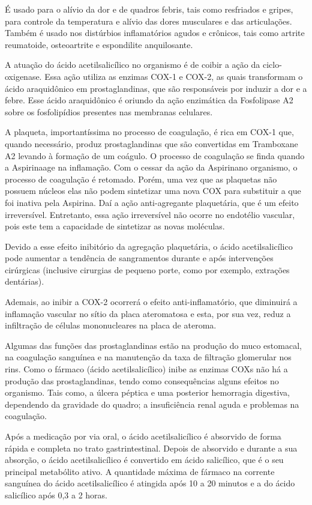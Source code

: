 É usado para o alívio da dor e de quadros febris, tais como resfriados e gripes, para controle da
temperatura e alívio das dores musculares e das articulações. Também é usado nos distúrbios
inflamatórios agudos e crônicos, tais como artrite reumatoide, osteoartrite e espondilite
anquilosante.~\cite{bulaaspirina}

A atuação do ácido acetilsalicílico no organismo é de coibir a ação da ciclo-oxigenase. Essa ação
utiliza as enzimas COX-1 e COX-2, as quais transformam o ácido araquidônico em prostaglandinas, que
são responsáveis por induzir a dor e a febre. Esse ácido araquidônico é oriundo da ação enzimática
da Fosfolipase A2 sobre os fosfolipídios presentes nas membranas celulares. 

A plaqueta, importantíssima no processo de coagulação, é rica em COX-1 que, quando necessário,
produz prostaglandinas que são convertidas em Tramboxane A2 levando à formação de um coágulo. O
processo de coagulação se finda quando a Aspirina\R age na inflamação. Com o cessar da ação da
Aspirina\R no organismo, o processo de coagulação é retomado. Porém, uma vez que as plaquetas não
possuem núcleos elas não podem sintetizar uma nova COX para substituir a que foi inativa pela
Aspirina\R. Daí a ação anti-agregante plaquetária, que é um efeito irreversível. Entretanto, essa
ação irreversível não ocorre no endotélio vascular, pois este tem a capacidade de sintetizar as
novas moléculas. 

Devido a esse efeito inibitório da agregação plaquetária, o ácido acetilsalicílico pode aumentar a
tendência de sangramentos durante e após intervenções cirúrgicas (inclusive cirurgias de pequeno
porte, como por exemplo, extrações dentárias).~\cite{bulaaspirina}

Ademais, ao inibir a COX-2 ocorrerá o efeito anti-inflamatório, que diminuirá a inflamação vascular
no sítio da placa ateromatosa e esta, por sua vez, reduz a infiltração de células mononucleares na
placa de ateroma.~\cite{Grassi2012}

Algumas das funções das prostaglandinas estão na produção do muco estomacal, na coagulação sanguínea
e na manutenção da taxa de filtração glomerular nos rins. Como o fármaco (ácido acetilsalicílico)
inibe as enzimas COXs não há a produção das prostaglandinas, tendo como consequências alguns efeitos
no organismo.  Tais como, a úlcera péptica e uma posterior hemorragia digestiva, dependendo da
gravidade do quadro; a insuficiência renal aguda e problemas na coagulação. 

Após a medicação por via oral, o ácido acetilsalicílico é absorvido de forma rápida e completa no
trato gastrintestinal. Depois de absorvido e durante a sua absorção, o ácido acetilsalicílico é
convertido em ácido salicílico, que é o seu principal metabólito ativo. A quantidade máxima de
fármaco na corrente sanguínea do ácido acetilsalicílico é atingida após 10 a 20 minutos e a do ácido
salicílico após 0,3 a 2 horas. 


